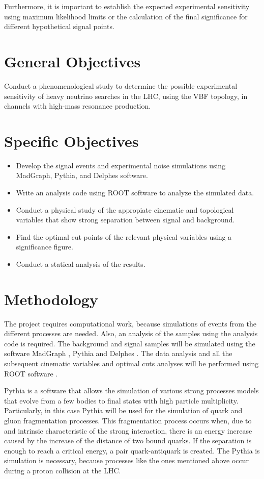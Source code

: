 \documentclass[12pt]{article}
\begin{document}
Furthermore, it is important to establish the expected experimental sensitivity using maximum likelihood limits or the calculation of the final significance for different hypothetical signal points. 

\section{General Objectives}

Conduct a phenomenological study to determine the possible experimental sensitivity of heavy neutrino searches in the LHC, using the VBF topology, in channels with high-mass resonance production. 

\section{Specific Objectives}

\begin{itemize}
	\item Develop the signal events and experimental noise simulations using MadGraph, Pythia, and Delphes software.
	\item Write an analysis code using ROOT software to analyze the simulated data.
	\item Conduct a physical study of the appropiate cinematic and topological variables that show strong separation between signal and background.
	\item Find the optimal cut points of the relevant physical variables using a significance figure.
    \item Conduct a statical analysis of the results.
\end{itemize}

\section{Methodology}

The project requires computational work, because simulations of events from the different processes are needed. Also, an analysis of the samples using the analysis code is required. The background and signal samples will be simulated using the software MadGraph \cite{MadGraph}, Pythia \cite{Pythia} and Delphes \cite{Delphes}. The data analysis and all the subsequent cinematic variables and optimal cuts analyses will be performed using ROOT software \cite{ROOT}.

Pythia is a software that allows the simulation of various strong processes models that evolve from a few bodies to final states with high particle multiplicity. Particularly, in this case Pythia will be used for the simulation of quark and gluon fragmentation processes. This fragmentation process occurs when, due to and intrinsic characteristic of the strong interaction, there is an energy increase caused by the increase of the distance of two bound quarks. If the separation is enough to reach a critical energy, a pair quark-antiquark is created. The Pythia is simulation is necessary, because processes like the ones mentioned above occur during a proton collision at the LHC.
\end{document}
